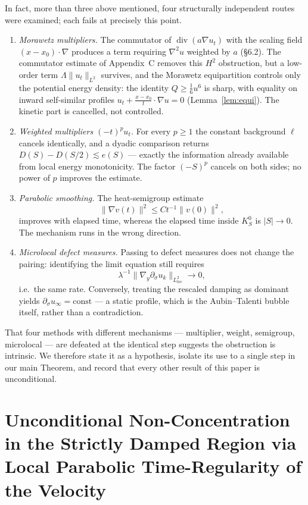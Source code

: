 \documentclass[11pt,letterpaper]{amsart}
\newcommand{\dive}{\operatorname{div}}
\begin{document}
In fact, more than three above mentioned, four structurally independent routes were examined; each fails at
precisely this point.
\begin{enumerate}
\item[(i)] \emph{Morawetz multipliers.} The commutator of
$\dive(a\nabla u_t)$ with the scaling field $(x-x_0)\cdot\nabla$
produces a term requiring $\nabla^2u$ weighted by $a$ (\S6.2).
The commutator estimate of Appendix~C removes this $H^2$ obstruction,
but a low-order term $\Lambda\|u_t\|_{L^2}$ survives, and the Morawetz
equipartition controls only the potential energy density: the identity
$Q\ge\tfrac16u^6$ is sharp, with equality on inward self-similar
profiles $u_t+\tfrac{x-x_0}{t}\cdot\nabla u=0$ (Lemma~\ref{lem:equi}).
The kinetic part is cancelled, not controlled.

\item[(ii)] \emph{Weighted multipliers $(-t)^pu_t$.} For every $p\ge1$
the constant background $\ell$ cancels identically, and a dyadic
comparison returns $D(S)-D(S/2)\lesssim e(S)$ --- exactly the
information already available from local energy monotonicity. The factor
$(-S)^p$ cancels on both sides; no power of $p$ improves the estimate.

\item[(iii)] \emph{Parabolic smoothing.} The heat-semigroup estimate
$$\|\nabla v(t)\|^2\le Ct^{-1}\|v(0)\|^2,$$ improves with elapsed time,
whereas the elapsed time inside $K_S^0$ is $|S|\to0$. The mechanism runs
in the wrong direction.

\item[(iv)] \emph{Microlocal defect measures.} Passing to defect
measures does not change the pairing: identifying the limit equation
still requires
$$\lambda^{-1}\|\nabla_y\partial_\sigma u_k\|_{L^2_{loc}}\to0,$$ i.e.\ the
same rate. Conversely, treating the rescaled damping as dominant yields
$\partial_\sigma u_\infty=\mathrm{const}$ --- a static profile, which is
the Aubin--Talenti bubble itself, rather than a contradiction.
\end{enumerate}

That four methods with different mechanisms --- multiplier, weight,
semigroup, microlocal --- are defeated at the identical step suggests the
obstruction is intrinsic. We therefore state it as a hypothesis, isolate
its use to a single step in our main Theorem, and record that
every other result of this paper is unconditional.

\section{Unconditional Non-Concentration in the Strictly Damped Region
\large via Local Parabolic Time-Regularity of the Velocity}
\end{document}
